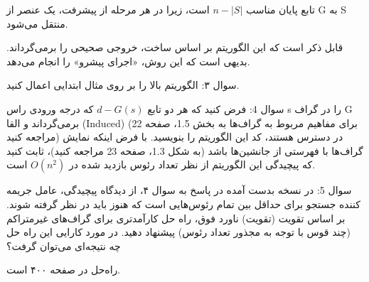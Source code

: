 \documentclass{book} %
\begin{document}
تابع پایان مناسب $n−|S|$ است، زیرا در هر مرحله از پیشرفت، یک عنصر از G به S منتقل می‌شود.

قابل ذکر است که این الگوریتم بر اساس ساخت، خروجی صحیحی را برمی‌گرداند. بدیهی است که این روش، «اجرای پیشرو» را انجام می‌دهد.

سوال ۳: الگوریتم بالا را بر روی مثال ابتدایی اعمال کنید.


سوال 4: فرض کنید که هر دو تابع $d−G(s)$ که درجه ورودی راس s را در گراف G برمی‌گرداند
و القا (Induced) (برای مفاهیم مربوط به گراف‌ها به بخش 1.5، صفحه 22 مراجعه کنید) در دسترس هستند،
کد این الگوریتم را بنویسید. با فرض اینکه نمایش گراف‌ها با فهرستی از جانشین‌ها باشد
(به شکل 1.3، صفحه 23 مراجعه کنید)، ثابت کنید که پیچیدگی این الگوریتم از نظر تعداد رئوس بازدید شده
در $O(n^2)$ است.

سوال 5: در نسخه بدست آمده در پاسخ به سوال ۴، از دیدگاه پیچیدگی، عامل جریمه کننده
جستجو برای حداقل بین تمام رئوس‌هایی است که هنوز باید در نظر گرفته شوند. بر اساس تقویت (تقویت) ناورد فوق، راه حل کارآمدتری برای گراف‌های غیرمتراکم (چند قوس با توجه به مجذور تعداد رئوس) پیشنهاد دهید. در مورد کارایی
این راه حل چه نتیجه‌ای می‌توان گرفت؟

راه‌حل در صفحه ۴۰۰ است.
\end{document}
